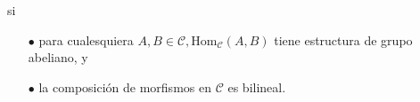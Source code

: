 \documentclass[preview]{standalone}
\begin{document}
\begin{center}
si \begin{itemize} \item[$\bullet$] para cualesquiera $A,B\in\mathscr{C}, \text{Hom}_\mathscr{C}(A,B)$ tiene estructura de grupo abeliano, y \item[$\bullet$] la composición de morfismos en $\mathscr{C}$ es bilineal.\end{itemize}
\end{center}
\end{document}
